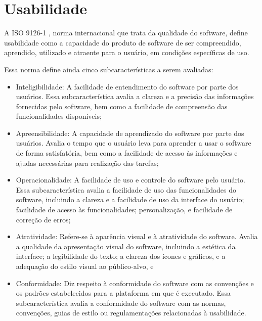 \section{Usabilidade}
\label{sec:Usabilidade}

A ISO 9126-1 \cite{iso9126}, norma internacional que trata da qualidade do software, 
define usabilidade como a capacidade do produto de software de ser compreendido, 
aprendido, utilizado e atraente para o usuário, em condições específicas de uso. 
\begin{description}
    \item Essa norma define ainda cinco subcaracterísticas a serem avaliadas:
          \begin{itemize}
              \item Inteligibilidade: A facilidade de entendimento do software por parte dos usuários. Essa 
              subcaracterística avalia a clareza e a precisão das informações fornecidas pelo software, bem 
              como a facilidade de compreensão das funcionalidades disponíveis;

              \item Apreensibilidade: A capacidade de aprendizado do software por parte dos usuários. Avalia 
              o tempo que o usuário leva para aprender a usar o software de forma satisfatória, bem como a 
                facilidade de acesso às informações e ajudas necessárias para realização das tarefas;

              \item Operacionalidade: A facilidade de uso e controle do software pelo usuário. Essa subcaracterística 
              avalia a facilidade de uso das funcionalidades do software, incluindo a clareza e a facilidade de uso 
              da interface do usuário; facilidade de acesso às funcionalidades; personalização, e facilidade de 
              correção de erros;

              \item Atratividade: Refere-se à aparência visual e à atratividade do software. Avalia a qualidade da 
              apresentação visual do software, incluindo a estética da interface; a legibilidade do texto; a clareza 
              dos ícones e gráficos, e a adequação do estilo visual ao público-alvo, e

              \item Conformidade: Diz respeito à conformidade do software com as convenções e os padrões estabelecidos para 
              a plataforma em que é executado. Essa subcaracterística avalia a conformidade do software com as normas, 
              convenções, guias de estilo ou regulamentações relacionadas à usabilidade.
          \end{itemize}
\end{description}



